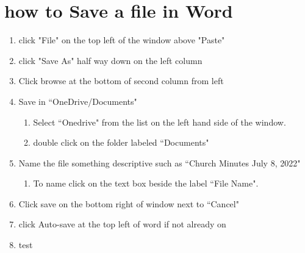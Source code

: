 \documentclass[12pt,letterpaper]{article}
\begin{document}
\section{how to Save a file in Word}
\begin{enumerate}
\item click "File" on the top left of the window above "Paste"
\item click "Save As" half way down on the left column 
\item Click browse at the bottom of second column from left
\item Save in ``OneDrive/Documents"
    \begin{enumerate}
        \item Select ``Onedrive" from the list on the left hand side of the window.
        \item double click on the folder labeled ``Documents"
    \end{enumerate}
\item Name the file something descriptive such as ``Church Minutes July 8, 2022"
    \begin{enumerate}
       \item To name click on the text box beside the label ``File Name".
    \end{enumerate}
\item Click save on the bottom right of window next to ``Cancel" 
\item click Auto-save at the top left of word if not already on
\item test
\end{enumerate}
\end{document}

